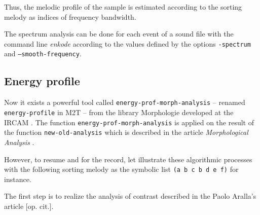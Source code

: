 Thus, the melodic profile of the sample is estimated according to the sorting melody as indices of frequency bandwidth.

\bigskip 

The spectrum analysis can be done for each event of a sound file with the command line \textsl{enkode} according to the values defined by the options \texttt{-spectrum} and \texttt{--smooth-frequency}.

\subsection{Energy profile}

Now it exists a powerful tool called \texttt{energy-prof-morph-analysis} -- renamed \texttt{energy-profile} in M2T -- from the library Morphologie developed at the IRCAM \citep{mp}. The function \texttt{energy-prof-morph-analysis} is applied on the result of the function \texttt{new-old-analysis} which is described in the article \textit{Morphological Analysis} \citep{ma}.

\bigskip 

However, to resume and for the record, let illustrate these algorithmic processes with the following sorting melody as the symbolic list \texttt{(a b c b d e f)} for instance.

The first step is to realize the analysis of contrast described in the Paolo Aralla's article [op. cit.].

\bigskip


